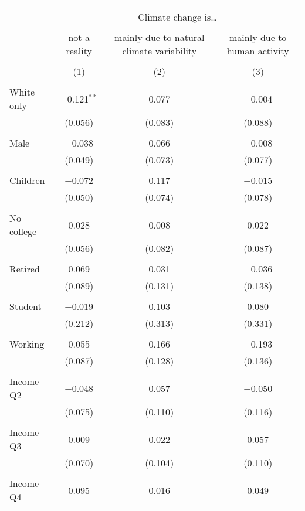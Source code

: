 
\begin{tabular}{@{\extracolsep{5pt}}lccc} 
\\[-1.8ex]\hline 
\hline \\[-1.8ex] 
 & \multicolumn{3}{c}{Climate change is…} \\ 
\cline{2-4} 
\\[-1.8ex] & not a reality & mainly due to natural climate variability & mainly due to human activity \\ 
\\[-1.8ex] & (1) & (2) & (3)\\ 
\hline \\[-1.8ex] 
 White only & $-$0.121$^{**}$ & 0.077 & $-$0.004 \\ 
  & (0.056) & (0.083) & (0.088) \\ 
  & & & \\ 
 Male & $-$0.038 & 0.066 & $-$0.008 \\ 
  & (0.049) & (0.073) & (0.077) \\ 
  & & & \\ 
 Children & $-$0.072 & 0.117 & $-$0.015 \\ 
  & (0.050) & (0.074) & (0.078) \\ 
  & & & \\ 
 No college & 0.028 & 0.008 & 0.022 \\ 
  & (0.056) & (0.082) & (0.087) \\ 
  & & & \\ 
 Retired & 0.069 & 0.031 & $-$0.036 \\ 
  & (0.089) & (0.131) & (0.138) \\ 
  & & & \\ 
 Student & $-$0.019 & 0.103 & 0.080 \\ 
  & (0.212) & (0.313) & (0.331) \\ 
  & & & \\ 
 Working & 0.055 & 0.166 & $-$0.193 \\ 
  & (0.087) & (0.128) & (0.136) \\ 
  & & & \\ 
 Income Q2 & $-$0.048 & 0.057 & $-$0.050 \\ 
  & (0.075) & (0.110) & (0.116) \\ 
  & & & \\ 
 Income Q3 & 0.009 & 0.022 & 0.057 \\ 
  & (0.070) & (0.104) & (0.110) \\ 
  & & & \\ 
 Income Q4 & 0.095 & 0.016 & 0.049 \\ 

\end{tabular}
